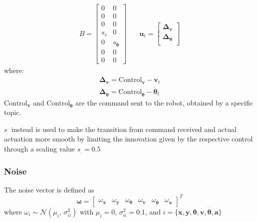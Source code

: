 \noindent 
\begin{align}
B
= 
    \begin{bmatrix} 
    0 & 0 \\
    0 & 0\\
    0 & 0\\
    s_v & 0\\
    0 & s_{ \dot{\boldsymbol \theta}}\\
    0 & 0\\
    0 & 0 
    \end{bmatrix}
& \quad
\mathbf{u}_t
= 
    \begin{bmatrix} 
    \boldsymbol \Delta_{\mathbf{v}}  \\
    \boldsymbol \Delta_{ \dot{\boldsymbol \theta}} \\[0.3em]
    \end{bmatrix}
\end{align}
where:
  \begin{align}
     \boldsymbol \Delta_{\mathbf{v}} = \text{Control}_{\mathbf{v}} - \mathbf{v}_t  \\
    \boldsymbol \Delta_{ \dot{\boldsymbol \theta}} = \text{Control}_{\dot{\boldsymbol \theta}} - \dot{\boldsymbol \theta}_t
  \end{align}
$ \text{Control}_{\mathbf{v}}$ and  $\text{Control}_{\mathbf{\dot{\boldsymbol \theta}}}$ are the command sent to the robot, obtained by a specific topic.

$s_{.}$ instead is used to make the transition from command received and actual actuation more smooth by limiting the innovation given by the respective control through a scaling value $s_. = 0.5$


\subsubsection{Noise}

\noindent 
The noise vector is defined as
\begin{equation}
\boldsymbol \omega
=
\begin{bmatrix} 
\omega_{\mathbf{x}}  & 
\omega_{\mathbf{y}} &
\omega_{\boldsymbol \theta}  & 
\omega_{\mathbf{v}} & 
\omega_{\dot{\boldsymbol \theta}} &
\omega_{\mathbf{a}}
\end{bmatrix} ^T
\end{equation}
where $\omega_i \sim \mathcal{N}(\mu_i,\,\sigma_{ii}^{2})$ with $\mu_i = 0$, $\sigma_{ii}^2 = 0.1$, and $ i = \{ \mathbf{x} , \mathbf{y} , \boldsymbol \theta , \mathbf{v} , \mathbf{\dot{\boldsymbol \theta}} , \mathbf{a} \}$

